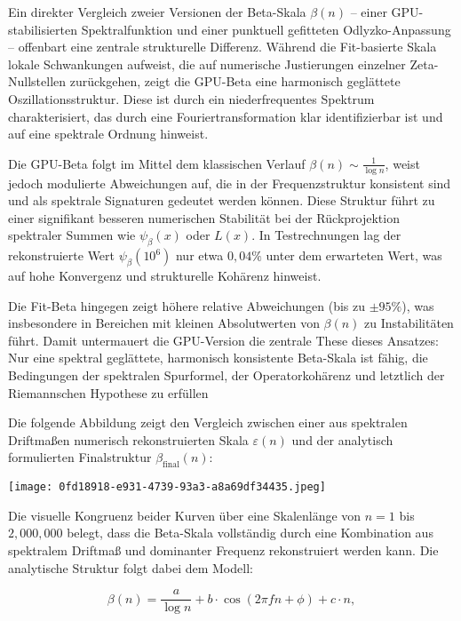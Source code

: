 \documentclass[11pt]{article}
\begin{document}
\begin{enumerate}
Ein direkter Vergleich zweier Versionen der Beta-Skala $\beta(n)$ – einer GPU-stabilisierten Spektralfunktion und einer punktuell gefitteten Odlyzko-Anpassung – offenbart eine zentrale strukturelle Differenz. Während die Fit-basierte Skala lokale Schwankungen aufweist, die auf numerische Justierungen einzelner Zeta-Nullstellen zurückgehen, zeigt die GPU-Beta eine harmonisch geglättete Oszillationsstruktur. Diese ist durch ein niederfrequentes Spektrum charakterisiert, das durch eine Fouriertransformation klar identifizierbar ist und auf eine spektrale Ordnung hinweist.

Die GPU-Beta folgt im Mittel dem klassischen Verlauf $\beta(n) \sim \frac{1}{\log n}$, weist jedoch modulierte Abweichungen auf, die in der Frequenzstruktur konsistent sind und als spektrale Signaturen gedeutet werden können. Diese Struktur führt zu einer signifikant besseren numerischen Stabilität bei der Rückprojektion spektraler Summen wie $\psi_\beta(x)$ oder $L(x)$. In Testrechnungen lag der rekonstruierte Wert $\psi_\beta(10^6)$ nur etwa $0{,}04\%$ unter dem erwarteten Wert, was auf hohe Konvergenz und strukturelle Kohärenz hinweist.

Die Fit-Beta hingegen zeigt höhere relative Abweichungen (bis zu $\pm95\%$), was insbesondere in Bereichen mit kleinen Absolutwerten von $\beta(n)$ zu Instabilitäten führt. Damit untermauert die GPU-Version die zentrale These dieses Ansatzes: Nur eine spektral geglättete, harmonisch konsistente Beta-Skala ist fähig, die Bedingungen der spektralen Spurformel, der Operatorkohärenz und letztlich der Riemannschen Hypothese zu erfüllen

    

Die folgende Abbildung zeigt den Vergleich zwischen einer aus spektralen Driftmaßen numerisch rekonstruierten Skala $\varepsilon(n)$ und der analytisch formulierten Finalstruktur $\beta_{\text{final}}(n)$:

\begin{center}
    \texttt{[image: 0fd18918-e931-4739-93a3-a8a69df34435.jpeg]}
\end{center}

Die visuelle Kongruenz beider Kurven über eine Skalenlänge von $n = 1$ bis $2{,}000{,}000$ belegt, dass die Beta-Skala vollständig durch eine Kombination aus spektralem Driftmaß und dominanter Frequenz rekonstruiert werden kann. Die analytische Struktur folgt dabei dem Modell:

\[
\beta(n) = \frac{a}{\log n} + b \cdot \cos(2\pi f n + \phi) + c \cdot n,
\]


\end{enumerate}
\end{document}

